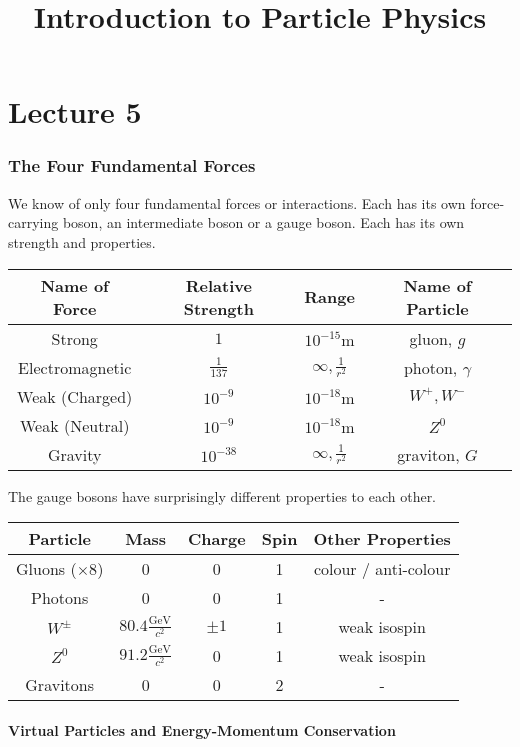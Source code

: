 \documentclass[10pt,a4paper]{article}
\title{Introduction to Particle Physics}
\newcommand{\gevcc}{\frac{\mathrm{GeV}}{c^2}}
\begin{document}
\part*{Lecture 5}

\section*{The Four Fundamental Forces}

We know of only four fundamental forces or interactions. Each has its own force-carrying boson, an intermediate boson or a gauge boson. Each has its own strength and properties.

\vspace*{20pt}

\begin{tabular}{c|ccc}
Name of Force & Relative Strength & Range & Name of Particle \\
\hline
Strong & $1$ & $10^{-15} \mathrm{m}$ & gluon, $g$ \\
Electromagnetic & $\frac{1}{137}$ & $\infty, \frac{1}{r^2}$ & photon, $\gamma$ \\
Weak (Charged) & $10^{-9}$ & $10^{-18} \mathrm{m}$ & $W^+, W^-$ \\
Weak (Neutral) & $10^{-9}$ & $10^{-18} \mathrm{m}$ & $Z^0$ \\
Gravity & $10^{-38}$ & $\infty, \frac{1}{r^2}$ & graviton, $G$
\end{tabular}

\vspace*{20pt}
The gauge bosons have surprisingly different properties to each other.

\vspace*{20pt}
\begin{tabular}{c|cccc}
Particle & Mass & Charge & Spin & Other Properties \\
\hline
Gluons ($\times 8$) & 0 & 0 & 1 & colour / anti-colour \\
Photons & 0 & 0 & 1 & - \\
$W^{\pm}$ & $80.4 \gevcc$ & $\pm 1$ & 1 & weak isospin \\
$Z^0$ & $91.2 \gevcc$ & 0 & 1 & weak isospin \\
Gravitons & 0 & 0 & 2 & -
\end{tabular}

\vspace*{20pt}
\subsection*{Virtual Particles and Energy-Momentum Conservation}
\end{document}
